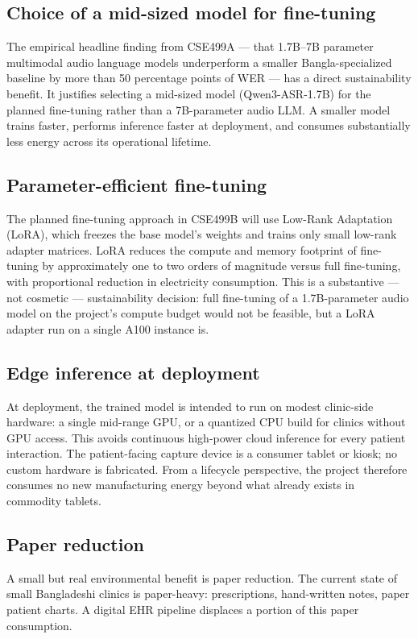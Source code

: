 \documentclass[12pt,a4paper]{article}
\begin{document}
\subsection{Choice of a mid-sized model for fine-tuning}
The empirical headline finding from CSE499A --- that 1.7B--7B
parameter multimodal audio language models underperform a smaller
Bangla-specialized baseline by more than 50 percentage points of WER
--- has a direct sustainability benefit. It justifies selecting a
mid-sized model (Qwen3-ASR-1.7B) for the planned fine-tuning rather
than a 7B-parameter audio LLM. A smaller model trains faster,
performs inference faster at deployment, and consumes substantially
less energy across its operational lifetime.

\subsection{Parameter-efficient fine-tuning}
The planned fine-tuning approach in CSE499B will use Low-Rank
Adaptation (LoRA), which freezes the base model's weights and trains
only small low-rank adapter matrices. LoRA reduces the compute and
memory footprint of fine-tuning by approximately one to two orders
of magnitude versus full fine-tuning, with proportional reduction in
electricity consumption. This is a substantive --- not cosmetic ---
sustainability decision: full fine-tuning of a 1.7B-parameter audio
model on the project's compute budget would not be feasible, but a
LoRA adapter run on a single A100 instance is.

\subsection{Edge inference at deployment}
At deployment, the trained model is intended to run on modest
clinic-side hardware: a single mid-range GPU, or a quantized CPU
build for clinics without GPU access. This avoids continuous
high-power cloud inference for every patient interaction. The
patient-facing capture device is a consumer tablet or kiosk; no
custom hardware is fabricated. From a lifecycle perspective, the
project therefore consumes no new manufacturing energy beyond what
already exists in commodity tablets.

\subsection{Paper reduction}
A small but real environmental benefit is paper reduction. The
current state of small Bangladeshi clinics is paper-heavy:
prescriptions, hand-written notes, paper patient charts. A digital
EHR pipeline displaces a portion of this paper consumption.
\end{document}
